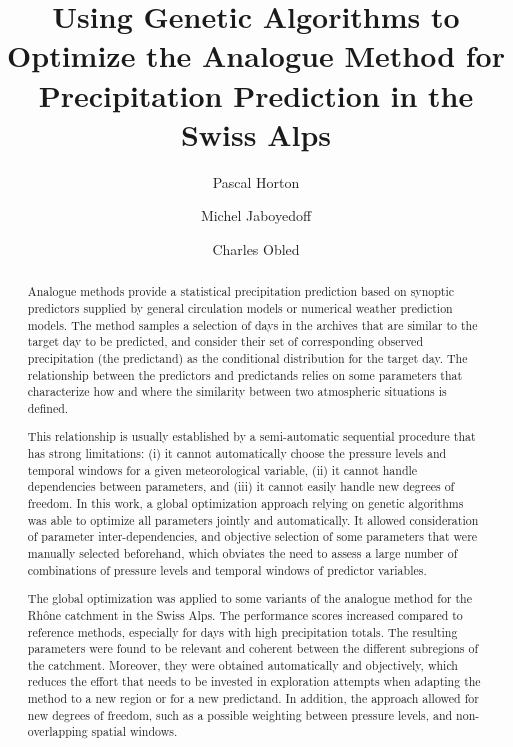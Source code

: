 \documentclass[review]{elsarticle}
\begin{document}
	
\begin{frontmatter}
	
\title{Using Genetic Algorithms to Optimize the Analogue Method for Precipitation Prediction in the Swiss Alps}

\author[unil,unibe,terranum]{Pascal Horton}

\author[unil]{Michel Jaboyedoff}
\author[lthe]{Charles Obled}

\address[unil]{University of Lausanne, Institute of Earth Sciences, Lausanne, Switzerland}
\address[unibe]{University of Bern, Oeschger Centre for Climate Change Research, Institute of Geography, Bern, Switzerland}
\address[lthe]{Universit\'{e} de Grenoble-Alpes, LTHE, Grenoble, France}

\begin{abstract}
	Analogue methods provide a statistical precipitation prediction based on synoptic predictors supplied by general circulation models or numerical weather prediction models. The method samples a selection of days in the archives that are similar to the target day to be predicted, and consider their set of corresponding observed precipitation (the predictand) as the conditional distribution for the target day. The relationship between the predictors and predictands relies on some parameters that characterize how and where the similarity between two atmospheric situations is defined.
	
	This relationship is usually established by a semi-automatic sequential procedure that has strong limitations: (i) it cannot automatically choose the pressure levels and temporal windows for a given meteorological variable, (ii) it cannot handle dependencies between parameters, and (iii) it cannot easily handle new degrees of freedom. In this work, a global optimization approach relying on genetic algorithms was able to optimize all parameters jointly and automatically. It allowed consideration of parameter inter-dependencies, and objective selection of some parameters that were manually selected beforehand, which obviates the need to assess a large number of combinations of pressure levels and temporal windows of predictor variables.
	
	The global optimization was applied to some variants of the analogue method for the Rh\^{o}ne catchment in the Swiss Alps. The performance scores increased compared to reference methods, especially for days with high precipitation totals. The resulting parameters were found to be relevant and coherent between the different subregions of the catchment. Moreover, they were obtained automatically and objectively, which reduces the effort that needs to be invested in exploration attempts when adapting the method to a new region or for a new predictand. In addition, the approach allowed for new degrees of freedom, such as a possible weighting between pressure levels, and non-overlapping spatial windows.
\end{abstract}


\end{frontmatter}
\end{document}

